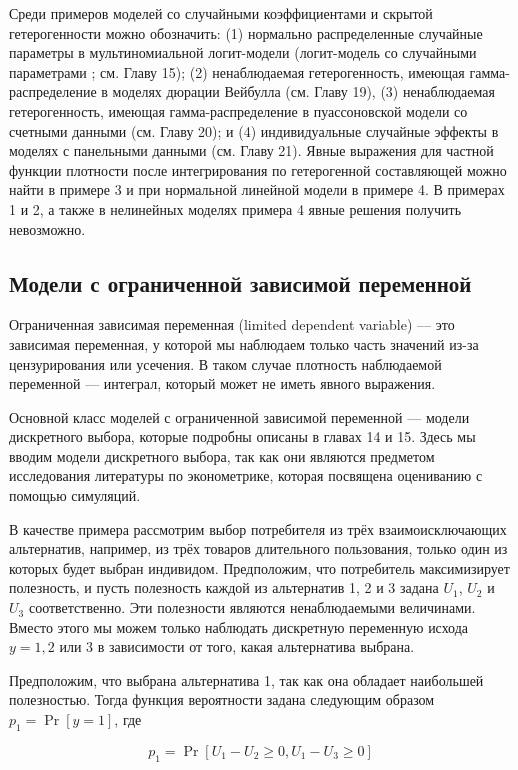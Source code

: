 Среди примеров моделей со случайными коэффициентами и скрытой гетерогенности можно обозначить: (1) нормально распределенные случайные параметры в мультиномиальной логит-модели (логит-модель со случайными параметрами ; см. Главу 15); (2) ненаблюдаемая гетерогенность, имеющая гамма-распределение в моделях дюрации Вейбулла (см. Главу 19), (3) ненаблюдаемая гетерогенность, имеющая гамма-распределение в пуассоновской модели со счетными  данными (см. Главу 20); и (4) индивидуальные случайные эффекты в моделях с панельными данными (см. Главу 21). Явные выражения для частной функции плотности после интегрирования по гетерогенной составляющей можно найти в примере 3 и при нормальной линейной модели в примере 4. В примерах 1 и 2, а также в нелинейных моделях примера 4 явные решения получить невозможно.


\subsection{Модели с ограниченной зависимой переменной}

Ограниченная зависимая переменная (limited dependent variable) --- это зависимая переменная, у которой мы наблюдаем только часть значений из-за цензурирования или усечения. В таком случае плотность наблюдаемой переменной --- интеграл, который может не иметь явного выражения.

Основной класс моделей с ограниченной зависимой переменной --- модели дискретного выбора, которые подробны описаны в главах 14 и 15. Здесь мы вводим модели дискретного выбора, так как они являются предметом исследования литературы по эконометрике, которая посвящена оцениванию с помощью симуляций.

В качестве примера рассмотрим выбор потребителя из трёх взаимоисключающих альтернатив, например, из трёх товаров длительного пользования, только один из которых будет выбран индивидом.  Предположим, что потребитель максимизирует полезность, и пусть полезность каждой из альтернатив 1, 2 и 3 задана $U_1$, $U_2$ и $U_3$ соответственно. Эти полезности являются ненаблюдаемыми величинами. Вместо этого мы можем только наблюдать дискретную переменную исхода $y = 1, 2$ или 3 в зависимости от того, какая альтернатива выбрана.

Предположим, что выбрана альтернатива 1, так как она обладает наибольшей полезностью. Тогда функция вероятности задана следующим образом $p_1 = \Pr[y=1]$, где

\[
p_1=\Pr[U_1-U_2 \geq  0, U_1-U_3 \geq  0]
\]

